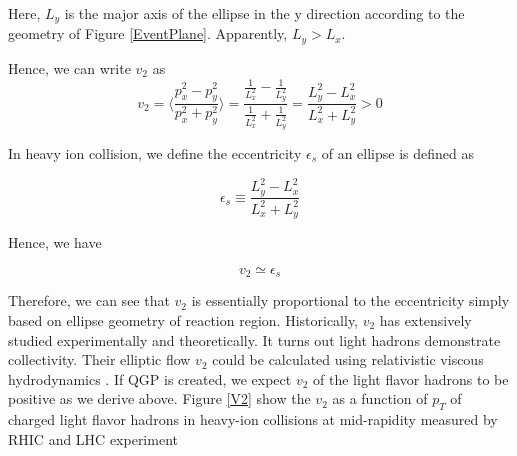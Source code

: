 Here,  $L_y$ is the major axis of the ellipse in the y direction according to the geometry of Figure \ref{EventPlane}. Apparently, $L_y > L_x$. 

Hence, we can write $v_2$ as 
\begin{equation}
v_2 =  \langle \frac{p_x^2 - p_y^2}{p_x^2 + p_y^2} \rangle = \frac{\frac{1}{L_x^2} - \frac{1}{L_y^2}}{\frac{1}{L_x^2} + \frac{1}{L_y^2}} =  \frac{L_y^2 - L_x^2}{L_x^2 + L_y^2}  > 0
\end{equation}

In heavy ion collision, we define the eccentricity $\epsilon_s$ of an ellipse is defined as \cite{V2Eccent}

\begin{equation}
\epsilon_s \equiv \frac{L_y^2 - L_x^2}{L_x^2 + L_y^2}
\end{equation}

Hence, we have

\begin{equation}
v_2 \simeq \epsilon_s
\end{equation}

Therefore, we can see that $v_2$ is essentially proportional to the eccentricity simply based on ellipse geometry of reaction region. Historically, $v_2$ has extensively studied experimentally and theoretically. It turns out light hadrons demonstrate collectivity. Their elliptic flow $v_2$ could be calculated using relativistic viscous hydrodynamics \cite{4DHydro}. If QGP is created, we expect $v_2$ of the light flavor hadrons to be positive as we derive above. Figure \ref{V2} show the $v_2$ as a function of $p_T$ of charged light flavor hadrons in heavy-ion collisions at mid-rapidity measured by RHIC and LHC experiment \cite{V2STAR,V2ALICE}

